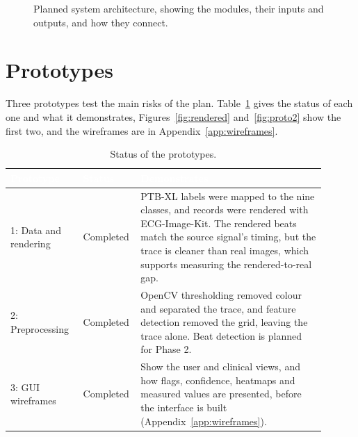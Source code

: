 \begin{figure}[H]
{%
  }
  \caption{Planned system architecture, showing the modules, their inputs and outputs, and how they connect.}
  \label{fig:architecture}
\end{figure}

\section{Prototypes}
\label{sec:prototypes}

Three prototypes test the main risks of the plan. Table~\ref{tab:prototypes} gives the status of each one and what it demonstrates, Figures~\ref{fig:rendered} and~\ref{fig:proto2} show the first two, and the wireframes are in Appendix~\ref{app:wireframes}.

\begin{table}[H]
  \centering
  \footnotesize
  \setlength{\arrayrulewidth}{0.8pt}
  \renewcommand{\arraystretch}{1.15}
  \caption{Status of the prototypes.}
  \label{tab:prototypes}
  \begin{tabular}{|p{0.22\linewidth}|p{0.12\linewidth}|p{0.56\linewidth}|}
    \hline
    \rowcolor{cyan!90!black}
    \textcolor{white}{\textbf{Prototype}} & \textcolor{white}{\textbf{Status}} &
    \textcolor{white}{\textbf{Demonstrates}} \\
    \hline
    1: Data and rendering & Completed & PTB-XL labels were mapped to the nine classes, and records were rendered with ECG-Image-Kit. The rendered beats match the source signal's timing, but the trace is cleaner than real images, which supports measuring the rendered-to-real gap. \\
    \hline
    2: Preprocessing & Completed & OpenCV thresholding removed colour and separated the trace, and feature detection removed the grid, leaving the trace alone. Beat detection is planned for Phase 2. \\
    \hline
    3: GUI wireframes & Completed & Show the user and clinical views, and how flags, confidence, heatmaps and measured values are presented, before the interface is built (Appendix~\ref{app:wireframes}). \\
    \hline
  \end{tabular}
\end{table}

